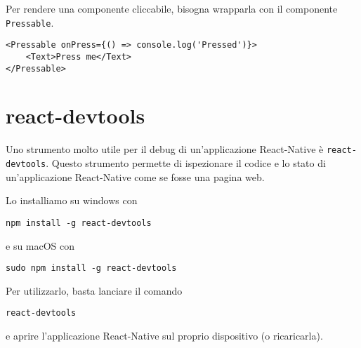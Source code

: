 \documentclass[12pt]{article}
\begin{document}
Per rendere una componente cliccabile, bisogna
wrapparla con il componente \texttt{Pressable}.
\begin{highlight}
\begin{verbatim}
<Pressable onPress={() => console.log('Pressed')}>
    <Text>Press me</Text>
</Pressable>
\end{verbatim}
\end{highlight}


\section{react-devtools}
Uno strumento molto utile per il debug di un'applicazione React-Native è
\texttt{react-devtools}. Questo strumento permette di ispezionare il codice
e lo stato di un'applicazione React-Native come se fosse una pagina web.

Lo installiamo su windows con 
\begin{highlight}
\begin{verbatim}
npm install -g react-devtools
\end{verbatim}  
\end{highlight}
e su macOS con
\begin{highlight}
\begin{verbatim}
sudo npm install -g react-devtools
\end{verbatim}
\end{highlight}

Per utilizzarlo, basta lanciare il comando
\begin{highlight}
\begin{verbatim}
react-devtools
\end{verbatim}
\end{highlight}
e aprire l'applicazione React-Native sul proprio dispositivo (o ricaricarla).
\end{document}
